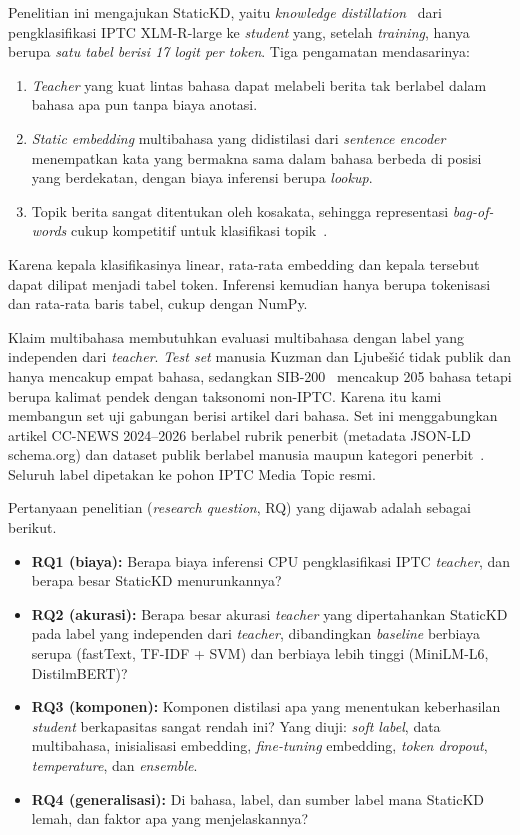 \documentclass[journal]{IEEEtran}
\newcommand{\eng}[1]{\textit{#1}}   %
\begin{document}
Penelitian ini mengajukan StaticKD, yaitu \eng{knowledge distillation}~\cite{hinton2015distilling} dari pengklasifikasi IPTC XLM-R-large ke \eng{student} yang, setelah \eng{training}, hanya berupa \emph{satu tabel berisi 17 logit per token}. Tiga pengamatan mendasarinya:
\begin{enumerate}
  \item \eng{Teacher} yang kuat lintas bahasa dapat melabeli berita tak berlabel dalam bahasa apa pun tanpa biaya anotasi.
  \item \eng{Static embedding} multibahasa yang didistilasi dari \eng{sentence encoder}~\cite{tulkens2024model2vec,wada2025static,chen2024bgem3} menempatkan kata yang bermakna sama dalam bahasa berbeda di posisi yang berdekatan, dengan biaya inferensi berupa \eng{lookup}.
  \item Topik berita sangat ditentukan oleh kosakata, sehingga representasi \eng{bag-of-words} cukup kompetitif untuk klasifikasi topik~\cite{galke2022bow}.
\end{enumerate}
Karena kepala klasifikasinya linear, rata-rata embedding dan kepala tersebut dapat dilipat menjadi tabel token. Inferensi kemudian hanya berupa tokenisasi dan rata-rata baris tabel, cukup dengan NumPy.

Klaim multibahasa membutuhkan evaluasi multibahasa dengan label yang independen dari \eng{teacher}. \eng{Test set} manusia Kuzman dan Ljube\v{s}i\'c tidak publik dan hanya mencakup empat bahasa, sedangkan SIB-200~\cite{adelani2024sib200} mencakup 205 bahasa tetapi berupa kalimat pendek dengan taksonomi non-IPTC. Karena itu kami membangun set uji gabungan berisi  artikel dari  bahasa. Set ini menggabungkan artikel CC-NEWS 2024--2026 berlabel rubrik penerbit (metadata JSON-LD schema.org) dan dataset publik berlabel manusia maupun kategori penerbit~\cite{adelani2023masakhanews,petukhova2023mnds,mirashi2023indicnews,hossain2025banglanews}. Seluruh label dipetakan ke pohon IPTC Media Topic resmi.

Pertanyaan penelitian (\eng{research question}, RQ) yang dijawab adalah sebagai berikut.
\begin{itemize}
  \item \textbf{RQ1 (biaya):} Berapa biaya inferensi CPU pengklasifikasi IPTC \eng{teacher}, dan berapa besar StaticKD menurunkannya?
  \item \textbf{RQ2 (akurasi):} Berapa besar akurasi \eng{teacher} yang dipertahankan StaticKD pada label yang independen dari \eng{teacher}, dibandingkan \eng{baseline} berbiaya serupa (fastText, TF-IDF + SVM) dan berbiaya lebih tinggi (MiniLM-L6, DistilmBERT)?
  \item \textbf{RQ3 (komponen):} Komponen distilasi apa yang menentukan keberhasilan \eng{student} berkapasitas sangat rendah ini? Yang diuji: \eng{soft label}, data multibahasa, inisialisasi embedding, \eng{fine-tuning} embedding, \eng{token dropout}, \eng{temperature}, dan \eng{ensemble}.
  \item \textbf{RQ4 (generalisasi):} Di bahasa, label, dan sumber label mana StaticKD lemah, dan faktor apa yang menjelaskannya?
\end{itemize}
\end{document}
